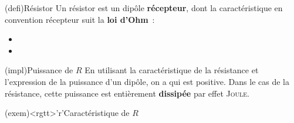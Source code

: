 \documentclass[../../main/main.tex]{subfiles}
\begin{document}
\begin{tcb*}[label=def:resistance, sidebyside](defi){Résistor}
	Un résistor est un dipôle \textbf{récepteur}, dont la caractéristique en
	convention récepteur suit la \textbf{loi d'Ohm}~:
	\psw{%
		\[
			\boxed{U=RI}
			\Lra
			\boxed{GU=I}
		\]
	}%
	\vspace{-15pt}
	\tcblower
	\begin{itemize}
		\item {}%
		\item {}%
	\end{itemize}
\end{tcb*}
\begin{tcbraster}[raster columns=2, raster equal height=rows]
	\begin{tcb*}[label=impl:resistance](impl){Puissance de $R$}
		En utilisant la caractéristique de la résistance et l'expression de la
		puissance d'un dipôle, on a
		\psw{%
			\[
				\boxed{P_{\text{reçue}} = RI^2 = \frac{U^2}{R} = GU^2}
			\]
		}%
		qui est positive. Dans le cas de la résistance, cette puissance est
		entièrement \textbf{dissipée} par effet \textsc{Joule}.
	\end{tcb*}
	\begin{tcb}[label=exem:resistance](exem)<rgtt>'r'{Caractéristique de $R$}
		\begin{center}
\end{center}
\end{tcb}
\end{tcbraster}
\end{document}
